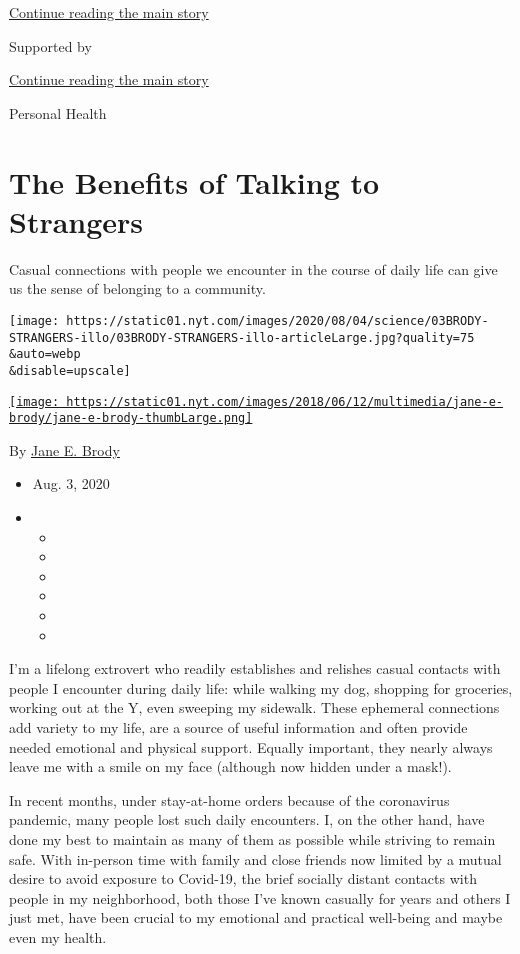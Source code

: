 \protect\hyperlink{after-top}{Continue reading the main story}

Supported by

\protect\hyperlink{after-sponsor}{Continue reading the main story}

Personal Health

\hypertarget{the-benefits-of-talking-to-strangers}{%
\section{The Benefits of Talking to
Strangers}\label{the-benefits-of-talking-to-strangers}}

Casual connections with people we encounter in the course of daily life
can give us the sense of belonging to a community.

\texttt{[image: https://static01.nyt.com/images/2020/08/04/science/03BRODY-STRANGERS-illo/03BRODY-STRANGERS-illo-articleLarge.jpg?quality=75\\\&auto=webp\\\&disable=upscale]}

\href{https://www.nytimes.com/by/jane-e-brody}{\texttt{[image: https://static01.nyt.com/images/2018/06/12/multimedia/jane-e-brody/jane-e-brody-thumbLarge.png]}}

By \href{https://www.nytimes.com/by/jane-e-brody}{Jane E. Brody}

\begin{itemize}
\item
  Aug. 3, 2020
\item
  \begin{itemize}
  \item
  \item
  \item
  \item
  \item
  \item
  \end{itemize}
\end{itemize}

I'm a lifelong extrovert who readily establishes and relishes casual
contacts with people I encounter during daily life: while walking my
dog, shopping for groceries, working out at the Y, even sweeping my
sidewalk. These ephemeral connections add variety to my life, are a
source of useful information and often provide needed emotional and
physical support. Equally important, they nearly always leave me with a
smile on my face (although now hidden under a mask!).

In recent months, under stay-at-home orders because of the coronavirus
pandemic, many people lost such daily encounters. I, on the other hand,
have done my best to maintain as many of them as possible while striving
to remain safe. With in-person time with family and close friends now
limited by a mutual desire to avoid exposure to Covid-19, the brief
socially distant contacts with people in my neighborhood, both those
I've known casually for years and others I just met, have been crucial
to my emotional and practical well-being and maybe even my health.

